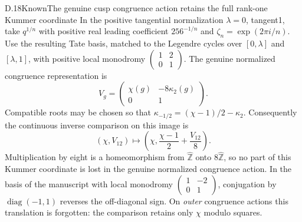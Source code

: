 \begin{statement}{D.18}{Known}{The genuine cusp congruence action retains the full rank-one Kummer coordinate}
In the positive tangential normalization $\lambda=0$, tangent1, take $q^{1/n}$ with positive real leading coefficient $256^{-1/n}$ and $\zeta_n=\exp(2\pi i/n)$. Use the resulting Tate basis, matched to the Legendre cycles over $[0,\lambda]$ and $[\lambda,1]$, with positive local monodromy $\left(\begin{smallmatrix}1&2\\0&1\end{smallmatrix}\right)$. The genuine normalized congruence representation is
\[
 V_g=\begin{pmatrix}\chi(g)&-8\kappa_2(g)\\0&1\end{pmatrix}.            \tag{D.16}
\]
Compatible roots may be chosen so that
$\kappa_{-1/2}=(\chi-1)/2-\kappa_2$. Consequently the continuous inverse comparison on this image is
\[
 (\chi,V_{12})\longmapsto
 \left(\chi,\frac{\chi-1}{2}+\frac{V_{12}}8\right).          \tag{D.17}
\]
Multiplication by eight is a homeomorphism from $\widehat{\mathbb Z}$ onto $8\widehat{\mathbb Z}$, so no part of this Kummer coordinate is lost in the genuine normalized congruence action. In the basis of the manuscript with local monodromy $\left(\begin{smallmatrix}1&-2\\0&1\end{smallmatrix}\right)$, conjugation by $\operatorname{diag}(-1,1)$ reverses the off-diagonal sign. On \emph{outer} congruence actions this translation is forgotten: the comparison retains only $\chi$ modulo squares.
\end{statement}
